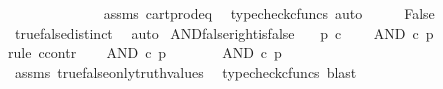 \begin{isabellebody}
\ \ \isamarkupfalse%
\ \isamarkupfalse%
\ {\isachardoublequoteopen}{\isasymt}\ {\isacharequal}{\kern0pt}\ {\isasymf}{\isachardoublequoteclose}\isanewline
\ \ \ \ \isamarkupfalse%
\ assms\ cart{\isacharunderscore}{\kern0pt}prod{\isacharunderscore}{\kern0pt}eq{}\ \isamarkupfalse%
\ {\isacharparenleft}{\kern0pt}typecheck{\isacharunderscore}{\kern0pt}cfuncs{\isacharcomma}{\kern0pt}\ auto{\isacharparenright}{\kern0pt}\isanewline
\ \ \isamarkupfalse%
\ \isamarkupfalse%
\ False\isanewline
\ \ \ \ \isamarkupfalse%
\ true{\isacharunderscore}{\kern0pt}false{\isacharunderscore}{\kern0pt}distinct\ \isamarkupfalse%
\ auto\isanewline
{}\isamarkupfalse%
%
\endisatagproof
{\isafoldproof}%
%
\isadelimproof
\isanewline
%
\endisadelimproof
\isanewline
{}\isamarkupfalse%
\ AND{\isacharunderscore}{\kern0pt}false{\isacharunderscore}{\kern0pt}right{\isacharunderscore}{\kern0pt}is{\isacharunderscore}{\kern0pt}false{\isacharcolon}{\kern0pt}\isanewline
\ \ \ {\isachardoublequoteopen}p\ {\isasymin}\isactrlsub c\ {\isasymOmega}{\isachardoublequoteclose}\isanewline
\ \ \ {\isachardoublequoteopen}AND\ {\isasymcirc}\isactrlsub c\ {\isasymlangle}p{\isacharcomma}{\kern0pt}{\isasymf}{\isasymrangle}\ {\isacharequal}{\kern0pt}\ {\isasymf}{\isachardoublequoteclose}\isanewline
%
\isadelimproof
%
\endisadelimproof
%
\isatagproof
{}\isamarkupfalse%
{\isacharparenleft}{\kern0pt}rule\ ccontr{\isacharparenright}{\kern0pt}\isanewline
\ \ \isamarkupfalse%
\ {\isachardoublequoteopen}AND\ {\isasymcirc}\isactrlsub c\ {\isasymlangle}p{\isacharcomma}{\kern0pt}{\isasymf}{\isasymrangle}\ {\isasymnoteq}\ {\isasymf}{\isachardoublequoteclose}\isanewline
\ \ \isamarkupfalse%
\ \isamarkupfalse%
\ {\isachardoublequoteopen}AND\ {\isasymcirc}\isactrlsub c\ {\isasymlangle}p{\isacharcomma}{\kern0pt}{\isasymf}{\isasymrangle}\ {\isacharequal}{\kern0pt}\ {\isasymt}{\isachardoublequoteclose}\isanewline
\ \ \ \ \isamarkupfalse%
\ assms\ true{\isacharunderscore}{\kern0pt}false{\isacharunderscore}{\kern0pt}only{\isacharunderscore}{\kern0pt}truth{\isacharunderscore}{\kern0pt}values\ \isamarkupfalse%
\ {\isacharparenleft}{\kern0pt}typecheck{\isacharunderscore}{\kern0pt}cfuncs{\isacharcomma}{\kern0pt}\ blast{\isacharparenright}{\kern0pt}\isanewline
\ \ \isamarkupfalse%
\ \isamarkupfalse%

\end{isabellebody}
